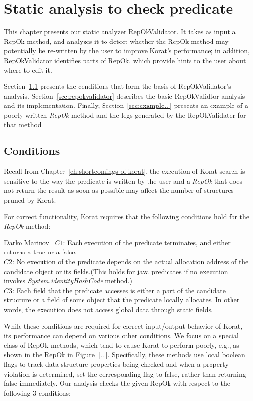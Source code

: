 \chapter{Static analysis to check predicate}
\label{ch:static-analysis}
This chapter presents our static analyzer RepOkValidator.  It takes as
input a RepOk method, and analyzes it to detect whether the RepOk
method may potentially be re-written by the user to improve Korat's
performance; in addition, RepOkValidator identifies parts of RepOk,
which provide hints to the user about where to edit it.

Section~\ref{sec:static-analysis-conditions} presents the conditions
that form the basis of RepOkValidator's analysis.
Section~\ref{sec:repokvalidator} describes the basic RepOkValidtor
analysis and its implementation.  Finally,
Section~\ref{sec:example...} presents an example of a poorly-written
\emph{RepOk} method and the logs generated by the RepOkValidator for
that method.

\section{Conditions}
\label{sec:static-analysis-conditions}
Recall from Chapter~\ref{ch:shortcomings-of-korat}, the execution of
Korat search is sensitive to the way the predicate is written by the
user and a \emph{RepOk} that does not return the result as soon as
possible may affect the number of structures pruned by Korat.

For correct functionality, Korat requires\cite{marinov2005automatic}
that the following conditions hold for the \emph{RepOk} method:

\begin{aquote}{Darko Marinov~\cite{marinov2005automatic}}
$C1$: Each execution of the predicate terminates, and either returns a
true or a false.\\ 
$C2$: No execution of the predicate depends on the actual allocation
address of the candidate object or its fields.(This holds for java
predicates if no execution invokes \emph{System.identityHashCode}
method.)\\ 
$C3$: Each field that the predicate accesses is either a part of the
candidate structure or a field of some object that the predicate
locally allocates. In other words, the execution does not access
global data through static fields.\\
\end{aquote}

While these conditions are required for correct input/output behavior
of Korat, its performance can depend on various other conditions.  We
focus on a special class of RepOk methods, which tend to cause Korat
to perform poorly, e.g., as shown in the RepOk in Figure~\ref{...}.
Specifically, these methods use local boolean flags to track data
structure properties being checked and when a property violation is
determined, set the corresponding flag to false, rather than returning
false immediately.  Our analysis checks the given RepOk with respect
to the following 3 conditions:

